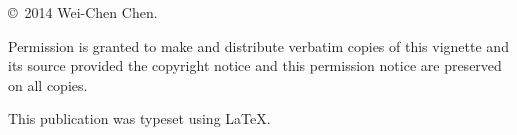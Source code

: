 \null
\vfill
\copyright\ 2014 Wei-Chen Chen.

Permission is granted to make and distribute verbatim copies of
this vignette and its source provided the copyright notice and
this permission notice are preserved on all copies.

This publication was typeset using \LaTeX.
